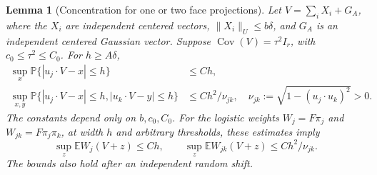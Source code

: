 \documentclass[11pt,letterpaper]{article}
\newtheorem{lemma}{Lemma}
\theoremstyle{remark}
\newcommand{\E}{\mathbb E}
\newcommand{\Pp}{\mathbb P}
\newcommand{\Cov}{\operatorname{Cov}}
\begin{document}
\begin{lemma}[Concentration for one or two face projections]
\label{lem:cap-concentration}
Let \(V=\sum_i X_i+G_A\), where the \(X_i\) are independent centered
vectors, \(\|X_i\|_U\le b\delta\), and \(G_A\) is an independent
centered Gaussian vector. Suppose
\(\Cov(V)=\tau^2I_r\), with \(c_0\le\tau^2\le C_0\).
For \(h\ge A\delta\),
\begin{align}
 \sup_x\Pp\{|u_j\cdot V-x|\le h\}&\le Ch,
 \label{cap:one-concentration}\\
 \sup_{x,y}\Pp\{|u_j\cdot V-x|\le h,
                 |u_k\cdot V-y|\le h\}
 &\le Ch^2/\nu_{jk},
 \quad \nu_{jk}:=\sqrt{1-(u_j\cdot u_k)^2}>0.
 \label{cap:two-concentration}
\end{align}
The constants depend only on \(b,c_0,C_0\).
For the logistic weights \(W_j=F\pi_j\) and
\(W_{jk}=F\pi_j\pi_k\), at width \(h\) and arbitrary thresholds,
these estimates imply
\begin{equation}
 \sup_z\E W_j(V+z)\le Ch,\qquad
 \sup_z\E W_{jk}(V+z)\le Ch^2/\nu_{jk}.
 \label{cap:weight-concentration}
\end{equation}
The bounds also hold after an independent random shift.
\end{lemma}
\end{document}
